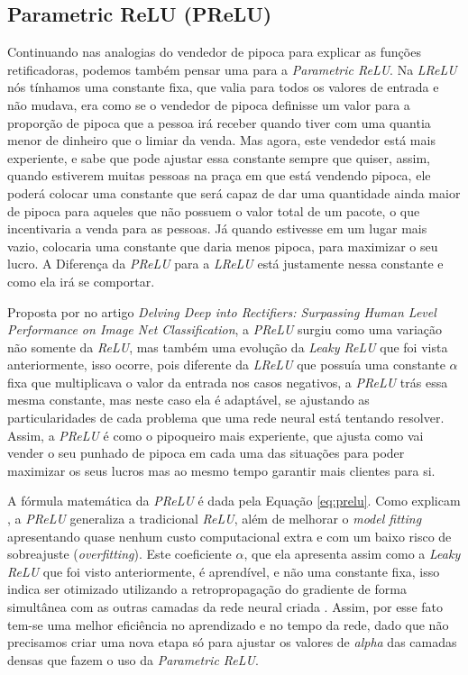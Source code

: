 \subsection{Parametric ReLU (PReLU)}

Continuando nas analogias do vendedor de pipoca para explicar as funções retificadoras, podemos também pensar uma para a \textit{Parametric ReLU}. Na \textit{LReLU} nós tínhamos uma constante fixa, que valia para todos os valores de entrada e não mudava, era como se o vendedor de pipoca definisse um valor para a proporção de pipoca que a pessoa irá receber quando tiver com uma quantia menor de dinheiro que o limiar da venda. Mas agora, este vendedor está mais experiente, e sabe que pode ajustar essa constante sempre que quiser, assim, quando estiverem muitas pessoas na praça em que está vendendo pipoca, ele poderá colocar uma constante que será capaz de dar uma quantidade ainda maior de pipoca para aqueles que não possuem o valor total de um pacote, o que incentivaria a venda para as pessoas. Já quando estivesse em um lugar mais vazio, colocaria uma constante que daria menos pipoca, para maximizar o seu lucro. A Diferença da \textit{PReLU} para a \textit{LReLU} está justamente nessa constante e como ela irá se comportar.

Proposta por \textcite{PReLUArticle} no artigo \textit{Delving Deep into Rectifiers: Surpassing Human Level Performance on Image Net Classification}, a \textit{PReLU} surgiu como uma variação não somente da \textit{ReLU}, mas também uma evolução da \textit{Leaky ReLU} que foi vista anteriormente, isso ocorre, pois diferente da \textit{LReLU} que possuía uma constante $\alpha$ fixa que multiplicava o valor da entrada nos casos negativos, a \textit{PReLU} trás essa mesma constante, mas neste caso ela é adaptável, se ajustando as particularidades de cada problema que uma rede neural está tentando resolver. Assim, a \textit{PReLU} é como o pipoqueiro mais experiente, que ajusta como vai vender o seu punhado de pipoca em cada uma das situações para poder maximizar os seus lucros mas ao mesmo tempo garantir mais clientes para si.

A fórmula matemática da \textit{PReLU} é dada pela Equação \ref{eq:prelu}. Como explicam \textcite{PReLUArticle}, a \textit{PReLU} generaliza a tradicional \textit{ReLU}, além de melhorar o \textit{model fitting} apresentando quase nenhum custo computacional extra e com um baixo risco de sobreajuste (\textit{overfitting}). Este coeficiente $\alpha$, que ela apresenta assim como a \textit{Leaky ReLU} que foi visto anteriormente, é aprendível, e não uma constante fixa, isso indica ser otimizado utilizando a retropropagação do gradiente de forma simultânea com as outras camadas da rede neural criada \parencite{PReLUArticle}. Assim, por esse fato tem-se uma melhor eficiência no aprendizado e no tempo da rede, dado que não precisamos criar uma nova etapa só para ajustar os valores de \textit{alpha} das camadas densas que fazem o uso da \textit{Parametric ReLU}.

